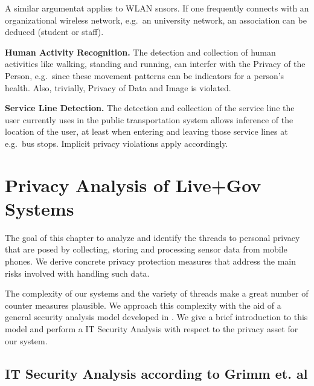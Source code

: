 A similar argumentat applies to WLAN snsors. If one frequently connects with an organizational wireless network, e.g.~an university network, an association can be deduced (student or staff).

\textbf{Human Activity Recognition.}
The detection and collection of human activities like walking, standing and running, can interfer with the Privacy of the Person, e.g.~since these movement patterns can be indicators for a person's health. Also, trivially, Privacy of Data and Image is violated.

\textbf{Service Line Detection.}
The detection and collection of the service line the user currently uses in the public transportation system allows inference of the location of the user, at least when entering and leaving those service lines at e.g.~bus stops.
Implicit privacy violations apply accordingly.



\pagebreak

\chapter{Privacy Analysis of Live+Gov Systems}
\label{chap:analysis}

The goal of this chapter to analyze and identify the threads to personal privacy that are posed by collecting, storing and processing sensor data from mobile phones.
We derive concrete privacy protection measures that address the main risks involved with handling such data.

The complexity of our systems and the variety of threads make a great number of counter measures plausible.
We approach this complexity with the aid of a general security analysis model developed in \cite{Grimm:ItSecRefModel}.
We give a brief introduction to this model and perform a IT Security Analysis with respect to the privacy asset for our system.

\section{IT Security Analysis according to Grimm et. al}\label{sec:GrimmModel}

